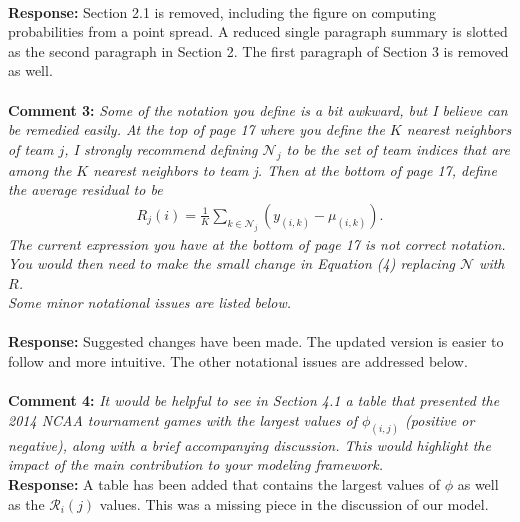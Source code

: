 \documentclass[11pt]{article} %
\begin{document}
\\
{\bf Response:} Section 2.1 is removed, including the figure on computing probabilities from a point spread. A reduced single paragraph summary is slotted as the second paragraph in Section 2. The first paragraph of Section 3 is removed as well. \\
\\
{\bf Comment 3:} \emph{Some of the notation you define is a bit awkward, but I believe can be remedied easily. At the top of page 17 where you define the $K$ nearest neighbors of team $j$, I strongly recommend defining $\mathcal{N}_j$ to be the set of team indices that are among the $K$ nearest neighbors to team j. Then at the bottom of page 17, define the average residual to be 
\begin{eqnarray*}
R_j(i)=\frac{1}{K} \sum_{k \in \mathcal{N}_j}(y_{(i,k)} - \mu_{(i,k)}).
\end{eqnarray*}
The current expression you have at the bottom of page 17 is not correct notation. You would then need to make the small change in Equation (4) replacing $\mathcal{N}$ with $R$.\\ 
Some minor notational issues are listed below.}\\
\\
{\bf Response:} Suggested changes have been made. The updated version is easier to follow and more intuitive. The other notational issues are addressed below. \\
\\
{\bf Comment 4:} \emph{It would be helpful to see in Section 4.1 a table that presented the 2014 NCAA tournament games with the largest values of $\phi_{(i,j)}$ (positive or negative), along with a brief accompanying discussion. This would highlight the impact of the main contribution to your modeling framework.}
\\
{\bf Response:} A table has been added that contains the largest values of $\phi$ as well as the $\mathcal{R}_i(j)$ values. This was a missing piece in the discussion of our model. \\
\end{document}
